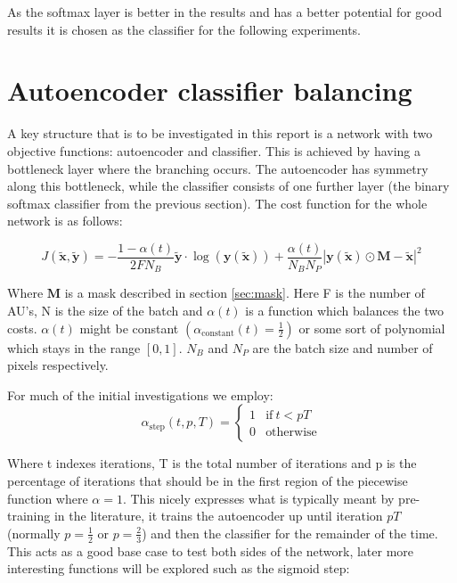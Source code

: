     As the softmax layer is better in the results and has a better potential for good results
    it is chosen as the classifier for the following experiments.

  \section{Autoencoder classifier balancing} \label{sec:autoalpha}
    A key structure that is to be investigated in this report is a network with two objective functions:
    autoencoder and classifier. This is achieved by having a bottleneck layer where the branching occurs.
    The autoencoder has symmetry along this bottleneck, while the classifier consists of one further layer
    (the binary softmax classifier from the previous section). The cost function for the whole network is as follows:

    \begin{equation}
        J(\tilde{\mathbf{x}},\tilde{\mathbf{y}}) = -\frac{1-\alpha(t)}{2FN_B}\tilde{\mathbf{y}}\cdot\log(\mathbf{y}(\tilde{\mathbf{x}}))
        + \frac{\alpha(t)}{N_BN_P}\left |\mathbf{y}(\tilde{\mathbf{x}}) \odot \mathbf{M}-\tilde{\mathbf{x}}\right | ^2
    \end{equation}

    Where $\mathbf{M}$ is a mask described in section \ref{sec:mask}. Here F is the number of AU's, N is the size of the batch and $\alpha(t)$ is a
    function which balances the two costs. $\alpha(t)$ might be constant $\left ( \alpha_{\text{constant}}(t)=\frac{1}{2} \right )$ or
    some sort of polynomial which stays in the range $[0,1]$. $N_B$ and $N_P$ are the batch size and number of pixels respectively.

    For much of the initial investigations we employ:
    \begin{equation}
    \alpha_{\text{step}}(t,p,T) =
    \begin{cases}
      1           & \text{if}\ t<pT \\
      0           & \text{otherwise}
    \end{cases}
    \end{equation}

    Where t indexes iterations, T is the total number of iterations and p is the
    percentage of iterations that should be in the first region of the piecewise function
    where $\alpha=1$.
    This nicely expresses what is typically meant by pre-training in the literature, it trains
    the autoencoder up until iteration $pT$ (normally $p=\frac{1}{2}$ or $p=\frac{2}{3}$) and then the classifier for the remainder of the time.
    This acts as a good base case to test both sides of the network, later more interesting
    functions will be explored such as the sigmoid step:

